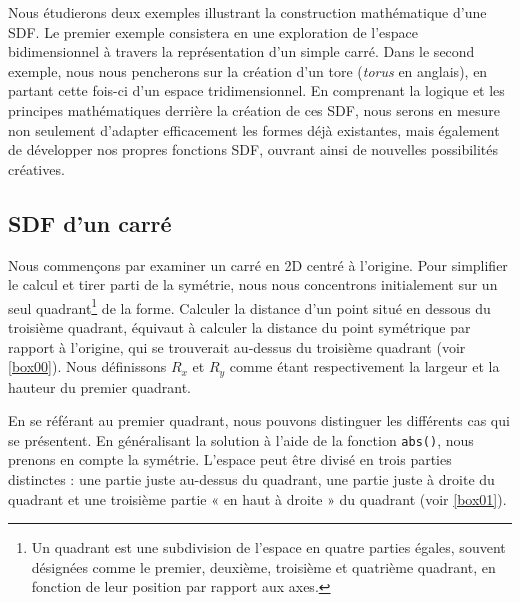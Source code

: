 Nous étudierons deux exemples illustrant la construction mathématique d'une SDF. Le premier exemple consistera en une exploration de l'espace bidimensionnel à travers la représentation d'un simple carré. Dans le second exemple, nous nous pencherons sur la création d'un tore (\textit{torus} en anglais), en partant cette fois-ci d'un espace tridimensionnel. En comprenant la logique et les principes mathématiques derrière la création de ces SDF, nous serons en mesure non seulement d'adapter efficacement les formes déjà existantes, mais également de développer nos propres fonctions SDF, ouvrant ainsi de nouvelles possibilités créatives.

\subsection*{SDF d'un carré}

Nous commençons par examiner un carré en 2D centré à l'origine. Pour simplifier le calcul et tirer parti de la symétrie, nous nous concentrons initialement sur un seul quadrant\footnote{Un quadrant est une subdivision de l'espace en quatre parties égales, souvent désignées comme le premier, deuxième, troisième et quatrième quadrant, en fonction de leur position par rapport aux axes.} de la forme. Calculer la distance d'un point situé en dessous du troisième quadrant, équivaut à calculer la distance du point symétrique par rapport à l'origine, qui se trouverait au-dessus du troisième quadrant (voir \ref{box00}). Nous définissons $R_x$ et $R_y$ comme étant respectivement la largeur et la hauteur du premier quadrant.

En se référant au premier quadrant, nous pouvons distinguer les différents cas qui se présentent. En généralisant la solution à l'aide de la fonction \lstinline{abs()}, nous prenons en compte la symétrie. L'espace peut être divisé en trois parties distinctes : une partie juste au-dessus du quadrant, une partie juste à droite du quadrant et une troisième partie « en haut à droite » du quadrant (voir \ref{box01}).

